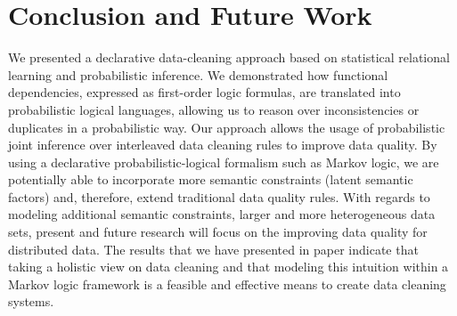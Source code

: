 
\section{Conclusion and Future Work}
\label{sec:conclusion}
We presented a declarative data-cleaning approach based on statistical relational learning and probabilistic inference. 
We demonstrated how functional dependencies, expressed as first-order logic formulas, are translated into probabilistic logical languages, allowing us to reason over inconsistencies or duplicates in a probabilistic way. Our approach allows the usage of probabilistic joint inference over interleaved data cleaning rules to improve data quality. By using a declarative probabilistic-logical formalism such as Markov logic, we are potentially able to incorporate more semantic constraints (latent semantic factors) and, therefore, extend traditional data quality rules. With regards to modeling additional semantic constraints, larger and more heterogeneous data sets, present and future research will focus on the improving data quality for distributed data. The results that we have presented in paper indicate that taking a holistic view on data cleaning and that modeling this intuition within a Markov logic framework is a feasible and effective means to create data cleaning systems. 